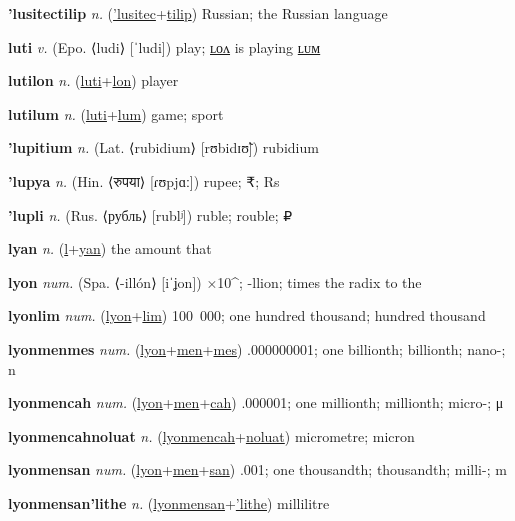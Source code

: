 \textbf{\hypertarget{'lusitectilip}{'lusitectilip}} \textit{n.} (\hyperlink{'lusitec}{'lusitec}+\allowbreak \hyperlink{tilip}{tilip})
Russian; the Russian language

\textbf{\hypertarget{luti}{luti}} \textit{v.} (Epo. ⟨ludi⟩ [ˈludi])
play; \hyperlink{lutilon}{ʟᴏᴧ} is playing \hyperlink{lutilum}{ʟᴜᴍ}

\textbf{\hypertarget{lutilon}{lutilon}} \textit{n.} (\hyperlink{luti}{luti}+\allowbreak \hyperlink{lon}{lon})
player

\textbf{\hypertarget{lutilum}{lutilum}} \textit{n.} (\hyperlink{luti}{luti}+\allowbreak \hyperlink{lum}{lum})
game; sport

\textbf{\hypertarget{'lupitium}{'lupitium}} \textit{n.} (Lat. ⟨rubidium⟩ [rʊbidɪʊ̃])
rubidium

\textbf{\hypertarget{'lupya}{'lupya}} \textit{n.} (Hin. ⟨{\devanagari{}रुपया}⟩ [ɾʊpjɑː])
rupee; ₹; Rs

\textbf{\hypertarget{'lupli}{'lupli}} \textit{n.} (Rus. ⟨рубль⟩ [rublʲ])
ruble; rouble; ₽

\textbf{\hypertarget{lyan}{lyan}} \textit{n.} (\hyperlink{l}{l}+\allowbreak \hyperlink{yan}{yan})
the amount that

\textbf{\hypertarget{lyon}{lyon}} \textit{num.} (Spa. ⟨-illón⟩ [iˈʝon])
×10\textasciicircum{}; -llion; times the radix to the

\textbf{\hypertarget{lyonlim}{lyonlim}} \textit{num.} (\hyperlink{lyon}{lyon}+\allowbreak \hyperlink{lim}{lim})
100~000; one hundred thousand; hundred thousand

\textbf{\hypertarget{lyonmenmes}{lyonmenmes}} \textit{num.} (\hyperlink{lyon}{lyon}+\allowbreak \hyperlink{men}{men}+\allowbreak \hyperlink{mes}{mes})
.000000001; one billionth; billionth; nano-; n

\textbf{\hypertarget{lyonmencah}{lyonmencah}} \textit{num.} (\hyperlink{lyon}{lyon}+\allowbreak \hyperlink{men}{men}+\allowbreak \hyperlink{cah}{cah})
.000001; one millionth; millionth; micro-; μ

\textbf{\hypertarget{lyonmencahnoluat}{lyonmencahnoluat}} \textit{n.} (\hyperlink{lyonmencah}{lyonmencah}+\allowbreak \hyperlink{noluat}{noluat})
micrometre; micron

\textbf{\hypertarget{lyonmensan}{lyonmensan}} \textit{num.} (\hyperlink{lyon}{lyon}+\allowbreak \hyperlink{men}{men}+\allowbreak \hyperlink{san}{san})
.001; one thousandth; thousandth; milli-; m

\textbf{\hypertarget{lyonmensan'lithe}{lyonmensan'lithe}} \textit{n.} (\hyperlink{lyonmensan}{lyonmensan}+\allowbreak \hyperlink{'lithe}{'lithe})
millilitre

